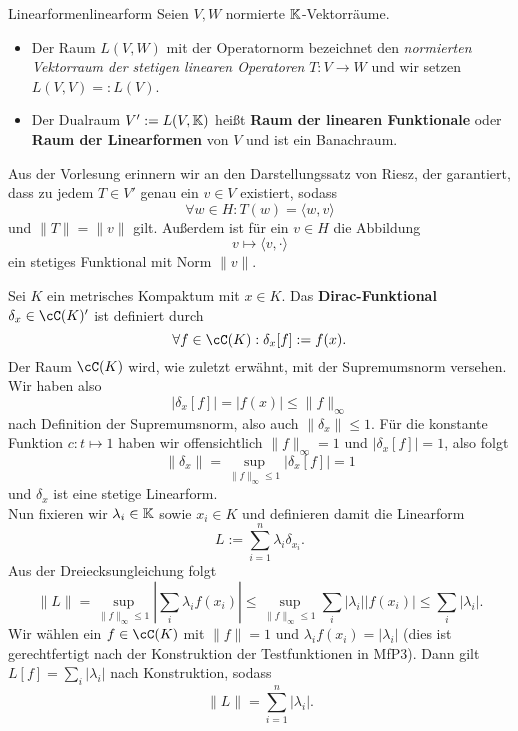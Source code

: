 \begin{definition}{Linearformen}{linearform}
Seien $V,W$ normierte $\mathbb{K}$-Vektorräume.
\begin{itemize}
	\item Der Raum $L(V,W)$ mit der Operatornorm bezeichnet den \textit{normierten Vektorraum der stetigen linearen Operatoren} $T: V \to W$ und wir setzen $L(V,V)=:L(V)$.
	\item Der Dualraum $V':=L(V, \mathbb{K})$ heißt \textbf{Raum der linearen Funktionale} oder \textbf{Raum der Linearformen} von $V$ und ist ein Banachraum.
\end{itemize}
\end{definition}
Aus der Vorlesung erinnern wir an den Darstellungssatz von Riesz, der garantiert, dass zu jedem $T \in V'$ genau ein $v \in V$ existiert, sodass
\[
\forall w \in H: T(w)=\langle w, v \rangle
\]
und $\|T\| = \|v\|$ gilt. Außerdem ist für ein $v \in H$ die Abbildung 
\[
v \mapsto \langle v, \cdot \rangle
\]
ein stetiges Funktional mit Norm $\|v\|$.
\begin{beispiel}
	Sei $K$ ein metrisches Kompaktum mit $x \in K$. Das \textbf{Dirac-Funktional} $\delta_x \in \cC(K)'$ ist definiert durch
	\[
		\forall f \in \cC(K): \delta_x[f] := f(x).
	\]
	Der Raum $\cC(K)$ wird, wie zuletzt erwähnt, mit der Supremumsnorm versehen. Wir haben also
	\[
		|\delta_x[f]| = |f(x)| \leq \|f\|_\infty
	\]
	nach Definition der Supremumsnorm, also auch $\| \delta_x \| \leq 1$. Für die konstante Funktion $c: t \mapsto 1$ haben wir offensichtlich $\|f\|_\infty = 1$ und $|\delta_x [f]| = 1$, also folgt
	\[
		\| \delta_x \| = \sup_{\|f\|_\infty \leq 1} | \delta_x[f] | = 1
	\]
	und $\delta_x$ ist eine stetige Linearform.\\
	Nun fixieren wir $\lambda_i \in \mathbb{K}$ sowie $x_i \in K$ und definieren damit die Linearform
	\[
		L := \sum_{i=1}^n \lambda_i \delta_{x_i}.
	\] 
	Aus der Dreiecksungleichung folgt
	\[
		\|L\| = \sup_{\|f\|_\infty \leq 1} \left| \sum_i \lambda_i  f(x_i) \right| \leq \sup_{\|f\|_\infty \leq 1}  \sum_i |\lambda_i| |f(x_i)| \leq \sum_i|\lambda_i|. 
	\]
	Wir wählen ein $f \in \cC(K)$ mit $\|f\| = 1$ und $\lambda_i f(x_i) = |\lambda_i|$ (dies ist gerechtfertigt nach der Konstruktion der Testfunktionen in MfP3). Dann gilt $L[f] = \sum_i |\lambda_i|$ nach Konstruktion, sodass
	\[
		\|L\|= \sum_{i=1}^n |\lambda_i|.
	\]
\end{beispiel}

